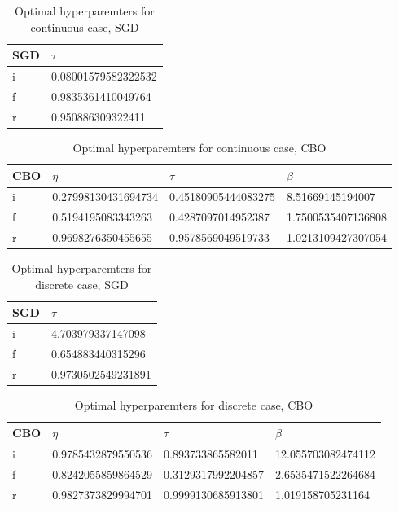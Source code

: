 \documentclass[10.5pt]{article}
\begin{document}
\begin{table}[H]\centering
  \begin{tabular}[]{l|l}
      SGD & $\tau$\\\hline
      i & 0.08001579582322532\\
      f & 0.9835361410049764\\
      r & 0.950886309322411
  \end{tabular}
  \caption{Optimal hyperparemters for continuous case, SGD}
\end{table}

\begin{table}[H]\centering
  \begin{tabular}[]{l|lll}
      CBO & $\eta$ & $\tau$ & $\beta$\\\hline
      i & 0.27998130431694734 & 0.45180905444083275 &
      8.51669145194007\\
      f & 0.5194195083343263 & 0.4287097014952387 &
      1.7500535407136808\\
      r & 0.9698276350455655 & 0.9578569049519733 &
      1.0213109427307054
  \end{tabular}
  \caption{Optimal hyperparemters for continuous case, CBO}
\end{table}

\begin{table}[H]\centering
  \begin{tabular}[]{l|l}
  SGD & $\tau$\\\hline
  i & 4.703979337147098\\
  f & 0.654883440315296\\
  r & 0.9730502549231891
  \end{tabular}
  \caption{Optimal hyperparemters for discrete case, SGD}
\end{table}

\begin{table}[H]\centering
  \begin{tabular}[]{l|lll}
  CBO & $\eta$ & $\tau$ & $\beta$\\\hline
  i & 0.9785432879550536 & 0.893733865582011 &
  12.055703082474112\\
  f & 0.8242055859864529 & 0.3129317992204857 &
  2.6535471522264684\\
  r & 0.9827373829994701 & 0.9999130685913801 &
  1.019158705231164
  \end{tabular}
  \caption{Optimal hyperparemters for discrete case, CBO}
\end{table}
\end{document}
